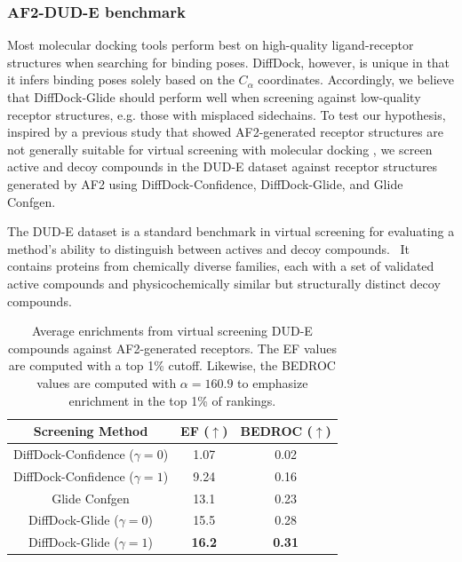 \subsubsection{AF2-DUD-E benchmark}

Most molecular docking tools perform best on high-quality ligand-receptor structures when searching for binding poses. DiffDock, however, is unique in that it infers binding poses solely based on the $C_\alpha$ coordinates. Accordingly, we believe that DiffDock-Glide should perform well when screening against low-quality receptor structures, e.g. those with misplaced sidechains. To test our hypothesis, inspired by a previous study that showed AF2-generated receptor structures are not generally suitable for virtual screening with molecular docking \cite{zhang2023benchmarking}, we screen active and decoy compounds in the DUD-E dataset against receptor structures generated by AF2 using DiffDock-Confidence, DiffDock-Glide, and Glide Confgen.

The DUD-E dataset is a standard benchmark in virtual screening for evaluating a method's ability to distinguish between actives and decoy compounds.~\cite{mysinger2012dude} It contains proteins from chemically diverse families, each with a set of validated active compounds and physicochemically similar but structurally distinct decoy compounds.

\begin{table}[h]
    \centering
    \begin{tabular}{|c||c|c|}
        \hline
        Screening Method & EF ($\uparrow$) & BEDROC ($\uparrow$) \\
        \hline
        \hline
        DiffDock-Confidence ($\gamma=0$) & 1.07 & 0.02 \\
        \hline
        DiffDock-Confidence ($\gamma=1$) & 9.24 & 0.16 \\
        \hline
        Glide Confgen & 13.1 & 0.23 \\
        \hline
        DiffDock-Glide ($\gamma=0$) & 15.5 & 0.28 \\
        \hline
        DiffDock-Glide ($\gamma=1$) & \textbf{16.2} & \textbf{0.31} \\
        \hline
    \end{tabular}
    \caption[Average enrichments for virtual screening against AF2-generated receptors.]{Average enrichments from virtual screening DUD-E compounds against AF2-generated receptors. The EF values are computed with a top 1\% cutoff. Likewise, the BEDROC values are computed with $\alpha=160.9$ to emphasize enrichment in the top 1\% of rankings.}
    \label{ch5:table:enrichment}
\end{table}

